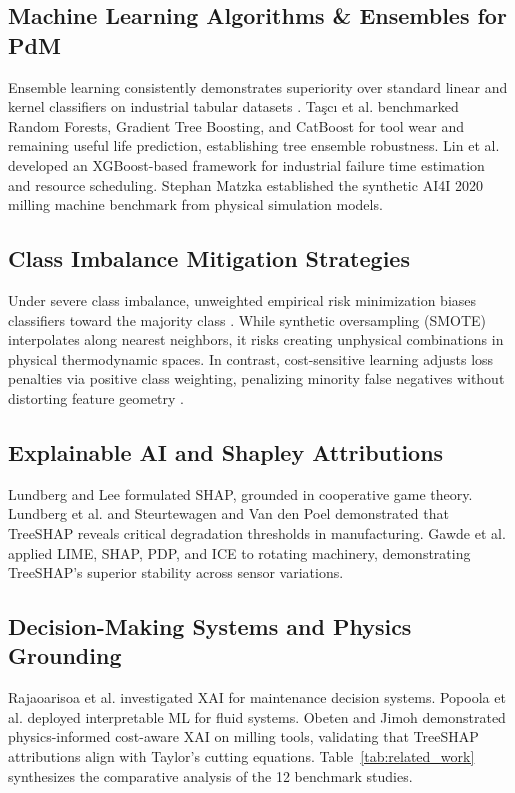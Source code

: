 \documentclass[journal,10pt,twocolumn]{IEEEtran}
\begin{document}
\subsection{Machine Learning Algorithms \& Ensembles for PdM}
Ensemble learning consistently demonstrates superiority over standard linear and kernel classifiers on industrial tabular datasets \cite{carvalho2019, tasci2023}. Taşcı et al. \cite{tasci2023} benchmarked Random Forests, Gradient Tree Boosting, and CatBoost for tool wear and remaining useful life prediction, establishing tree ensemble robustness. Lin et al. \cite{lin2025} developed an XGBoost-based framework for industrial failure time estimation and resource scheduling. Stephan Matzka \cite{matzka2020} established the synthetic AI4I 2020 milling machine benchmark from physical simulation models.

\subsection{Class Imbalance Mitigation Strategies}
Under severe class imbalance, unweighted empirical risk minimization biases classifiers toward the majority class \cite{carvalho2019}. While synthetic oversampling (SMOTE) interpolates along nearest neighbors, it risks creating unphysical combinations in physical thermodynamic spaces. In contrast, cost-sensitive learning adjusts loss penalties via positive class weighting, penalizing minority false negatives without distorting feature geometry \cite{lin2025, obeten2026}.

\subsection{Explainable AI and Shapley Attributions}
Lundberg and Lee \cite{lundberg2017} formulated SHAP, grounded in cooperative game theory. Lundberg et al. \cite{obeten2026} and Steurtewagen and Van den Poel \cite{steurtewagen2021} demonstrated that TreeSHAP reveals critical degradation thresholds in manufacturing. Gawde et al. \cite{gawde2021} applied LIME, SHAP, PDP, and ICE to rotating machinery, demonstrating TreeSHAP's superior stability across sensor variations.

\subsection{Decision-Making Systems and Physics Grounding}
Rajaoarisoa et al. \cite{rajaoarisoa2024} investigated XAI for maintenance decision systems. Popoola et al. \cite{popoola2026} deployed interpretable ML for fluid systems. Obeten and Jimoh \cite{obeten2026} demonstrated physics-informed cost-aware XAI on milling tools, validating that TreeSHAP attributions align with Taylor's cutting equations. Table~\ref{tab:related_work} synthesizes the comparative analysis of the 12 benchmark studies.
\end{document}
